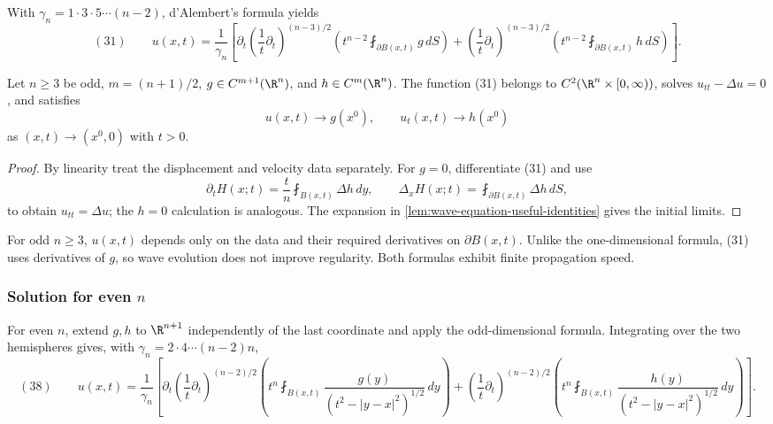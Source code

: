With $\gamma_n=1\cdot3\cdot5\cdots(n-2)$, d'Alembert's formula yields
$$(31)\qquad
u(x,t)=\frac1{\gamma_n}\left[
\partial_t\left(\frac1t\partial_t\right)^{(n-3)/2}
\left(t^{n-2}\fint_{\partial B(x,t)}g\,dS\right)
+\left(\frac1t\partial_t\right)^{(n-3)/2}
\left(t^{n-2}\fint_{\partial B(x,t)}h\,dS\right)
\right].$$

\begin{theorem}
\label{thm:wave-equation-odd-dimensions-solution}
\leanok
{}
Let $n\ge3$ be odd, $m=(n+1)/2$, $g\in C^{m+1}(\R^n)$, and
$h\in C^m(\R^n)$. The function (31) belongs to
$C^2(\R^n\times[0,\infty))$, solves $u_{tt}-\Delta u=0$, and satisfies
$$u(x,t)\to g(x^0),
\qquad
u_t(x,t)\to h(x^0)$$
as $(x,t)\to(x^0,0)$ with $t>0$.
\end{theorem}
\begin{proof}
\leanok
\sketch By linearity treat the displacement and velocity data separately.
For $g=0$, differentiate (31) and use
$$\partial_tH(x;t)=\frac t n\fint_{B(x,t)}\Delta h\,dy,
\qquad
\Delta_xH(x;t)=\fint_{\partial B(x,t)}\Delta h\,dS,$$
to obtain $u_{tt}=\Delta u$; the $h=0$ calculation is analogous. The expansion
in \cref{lem:wave-equation-useful-identities} gives the initial limits.
\end{proof}

\begin{remark}
\label{rem:wave-equation-odd-dimension-remarks}
For odd $n\ge3$, $u(x,t)$ depends only on the data and their required
derivatives on $\partial B(x,t)$. Unlike the one-dimensional formula, (31)
uses derivatives of $g$, so wave evolution does not improve regularity. Both
formulas exhibit finite propagation speed.
\end{remark}

\subsubsection{Solution for even $n$}
\label{sec:wave-solution-even-n}

For even $n$, extend $g,h$ to $\R^{n+1}$ independently of the last coordinate
and apply the odd-dimensional formula. Integrating over the two hemispheres
gives, with $\gamma_n=2\cdot4\cdots(n-2)n$,
$$(38)\qquad
u(x,t)=\frac1{\gamma_n}\left[
\partial_t\left(\frac1t\partial_t\right)^{(n-2)/2}
\left(t^n\fint_{B(x,t)}
\frac{g(y)}{(t^2-|y-x|^2)^{1/2}}\,dy\right)
+\left(\frac1t\partial_t\right)^{(n-2)/2}
\left(t^n\fint_{B(x,t)}
\frac{h(y)}{(t^2-|y-x|^2)^{1/2}}\,dy\right)
\right].$$

